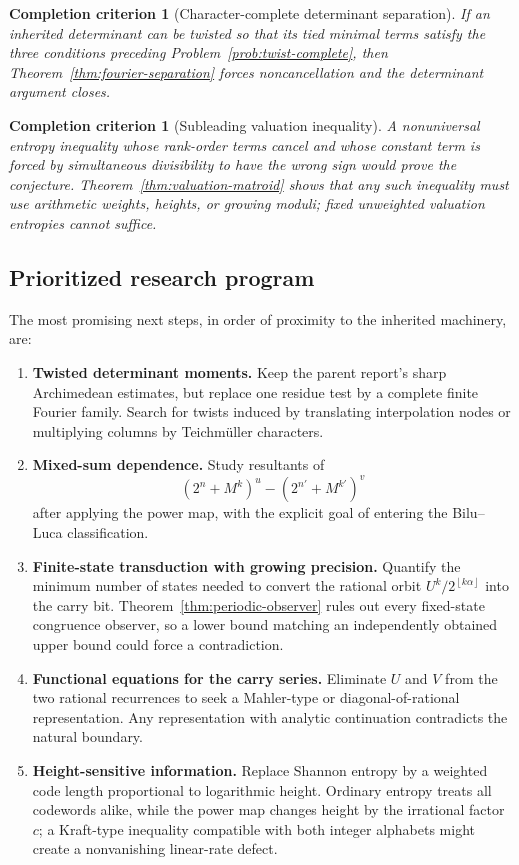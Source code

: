 \documentclass[11pt,oneside]{article}
\newtheorem{criterion}[theorem]{Completion criterion}
\theoremstyle{definition}
\theoremstyle{remark}
\newcommand{\floor}[1]{\left\lfloor #1\right\rfloor}
\begin{document}
\begin{criterion}[Character-complete determinant separation]\label{crit:character-complete}
If an inherited determinant can be twisted so that its tied minimal terms satisfy the three conditions preceding Problem~\ref{prob:twist-complete}, then Theorem~\ref{thm:fourier-separation} forces noncancellation and the determinant argument closes.
\end{criterion}

\begin{criterion}[Subleading valuation inequality]\label{crit:subleading}
A nonuniversal entropy inequality whose rank-order terms cancel and whose constant term is forced by simultaneous divisibility to have the wrong sign would prove the conjecture.  Theorem~\ref{thm:valuation-matroid} shows that any such inequality must use arithmetic weights, heights, or growing moduli; fixed unweighted valuation entropies cannot suffice.
\end{criterion}

\subsection{Prioritized research program}

The most promising next steps, in order of proximity to the inherited machinery, are:
\begin{enumerate}
 \item \textbf{Twisted determinant moments.}  Keep the parent report's sharp Archimedean estimates, but replace one residue test by a complete finite Fourier family.  Search for twists induced by translating interpolation nodes or multiplying columns by Teichm\"uller characters.
 \item \textbf{Mixed-sum dependence.}  Study resultants of
 \[
  (2^n+M^k)^u-(2^{n'}+M^{k'})^v
 \]
 after applying the power map, with the explicit goal of entering the Bilu--Luca classification.
 \item \textbf{Finite-state transduction with growing precision.}  Quantify the minimum number of states needed to convert the rational orbit \(U^k/2^{\floor{k\alpha}}\) into the carry bit.  Theorem~\ref{thm:periodic-observer} rules out every fixed-state congruence observer, so a lower bound matching an independently obtained upper bound could force a contradiction.
 \item \textbf{Functional equations for the carry series.}  Eliminate \(U\) and \(V\) from the two rational recurrences to seek a Mahler-type or diagonal-of-rational representation.  Any representation with analytic continuation contradicts the natural boundary.
 \item \textbf{Height-sensitive information.}  Replace Shannon entropy by a weighted code length proportional to logarithmic height.  Ordinary entropy treats all codewords alike, while the power map changes height by the irrational factor \(c\); a Kraft-type inequality compatible with both integer alphabets might create a nonvanishing linear-rate defect.
\end{enumerate}
\end{document}
